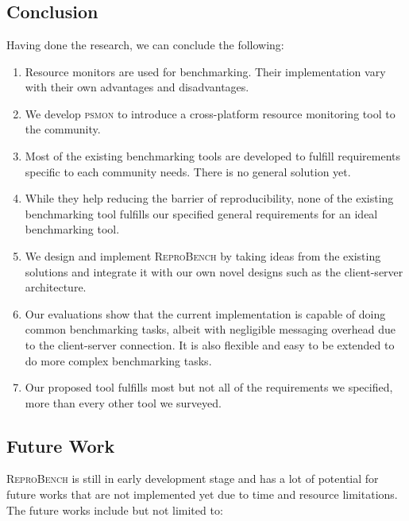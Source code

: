 \chapter{\chConclusion}
\label{ch:conclusion}



\section{Conclusion}

Having done the research, we can conclude the following:

\begin{enumerate}
    \item Resource monitors are used for benchmarking. Their implementation vary with their own advantages and disadvantages.
    \item We develop \textsc{psmon} to introduce a cross-platform resource monitoring tool to the community.
    \item Most of the existing benchmarking tools are developed to fulfill requirements specific to each community needs. There is no general solution yet.
    \item While they help reducing the barrier of reproducibility, none of the existing benchmarking tool fulfills our specified general requirements for an ideal benchmarking tool.
    \item We design and implement \textsc{ReproBench} by taking ideas from the existing solutions and integrate it with our own novel designs such as the client-server architecture.
    \item Our evaluations show that the current implementation is capable of doing common benchmarking tasks, albeit with negligible messaging overhead due to the client-server connection. It is also flexible and easy to be extended to do more complex benchmarking tasks.
    \item Our proposed tool fulfills most but not all of the requirements we specified, more than every other tool we surveyed.
\end{enumerate}

\section{Future Work}

\textsc{ReproBench} is still in early development stage and has a lot of potential for future works that are not implemented yet due to time and resource limitations.
The future works include but not limited to:

